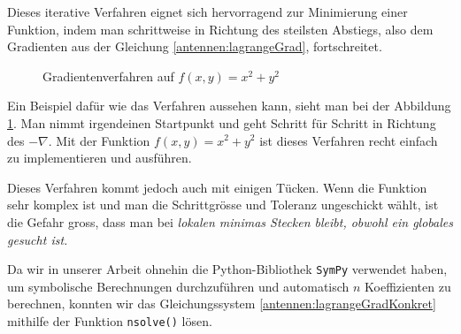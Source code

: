 Dieses iterative Verfahren eignet sich hervorragend zur Minimierung 
einer Funktion, indem man schrittweise in Richtung des steilsten Abstiegs,
also dem Gradienten aus der Gleichung \eqref{antennen:lagrangeGrad},
fortschreitet. 

\begin{figure}[htbp]
	\centering
	\caption{Gradientenverfahren auf $f(x,y)=x^2+y^2$}
	\label{antennen:gradverfahrenBSP}
\end{figure}

Ein Beispiel dafür wie das Verfahren aussehen kann, sieht man bei der 
Abbildung \ref{antennen:gradverfahrenBSP}. Man nimmt irgendeinen Startpunkt
und geht Schritt für Schritt in Richtung des $-\nabla$. Mit der Funktion
$f(x,y)=x^2+y^2$ ist dieses Verfahren recht einfach zu implementieren und ausführen.

Dieses Verfahren kommt jedoch auch mit einigen Tücken. Wenn die Funktion sehr komplex ist
und man die Schrittgrösse und Toleranz ungeschickt wählt, ist die Gefahr gross, dass man 
bei \em lokalen \em minimas Stecken bleibt, obwohl ein \em globales \em gesucht ist.

Da wir in unserer Arbeit ohnehin die Python-Bibliothek \texttt{SymPy} verwendet haben, 
um symbolische Berechnungen durchzuführen und automatisch $n$ Koeffizienten zu berechnen, 
konnten wir das Gleichungssystem \eqref{antennen:lagrangeGradKonkret} mithilfe der Funktion \texttt{nsolve()} lösen.

